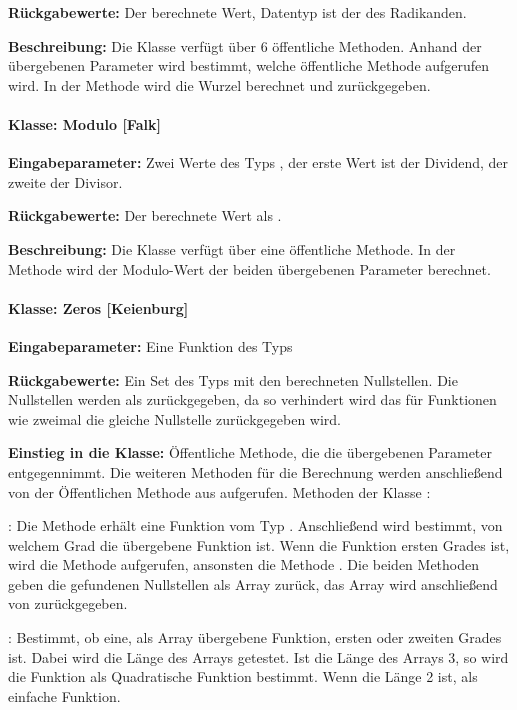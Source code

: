 \textbf{Rückgabewerte:} Der berechnete Wert, Datentyp ist der des Radikanden. 

\textbf{Beschreibung: }Die Klasse verfügt über 6 öffentliche Methoden. Anhand der übergebenen Parameter wird bestimmt, welche öffentliche Methode aufgerufen wird. In der Methode wird die Wurzel berechnet und zurückgegeben. 

\paragraph{Klasse: Modulo [Falk]}

\textbf{Eingabeparameter:} Zwei Werte des Typs , der erste Wert ist der Dividend, der zweite der Divisor. 

\textbf{Rückgabewerte:} Der berechnete Wert als . 

\textbf{Beschreibung:} Die Klasse verfügt über eine öffentliche Methode. In der Methode wird der Modulo-Wert der beiden übergebenen Parameter berechnet. 

\paragraph{Klasse: Zeros [Keienburg]}

\textbf{Eingabeparameter: }Eine Funktion des Typs 

\textbf{Rückgabewerte:} Ein Set des Typs  mit den berechneten Nullstellen. Die Nullstellen werden als  zurückgegeben, da so verhindert wird das für Funktionen wie  zweimal die gleiche Nullstelle zurückgegeben wird. 

\textbf{Einstieg in die Klasse:} Öffentliche Methode, die die übergebenen Parameter entgegennimmt. Die weiteren Methoden für die Berechnung werden anschließend von der Öffentlichen Methode aus aufgerufen. 
Methoden der Klasse :

: Die Methode erhält eine Funktion vom Typ . Anschließend wird bestimmt, von welchem Grad die übergebene Funktion ist. Wenn die Funktion ersten Grades ist, wird die Methode  aufgerufen, ansonsten die Methode . Die beiden Methoden geben die gefundenen Nullstellen als 
Array zurück, das Array wird anschließend von  zurückgegeben.
 
: Bestimmt, ob eine, als  Array übergebene Funktion, ersten oder zweiten Grades ist. Dabei wird die Länge des Arrays getestet. Ist die Länge des Arrays 3, so wird die Funktion als Quadratische Funktion bestimmt. Wenn die Länge 2 ist, als einfache Funktion. 

